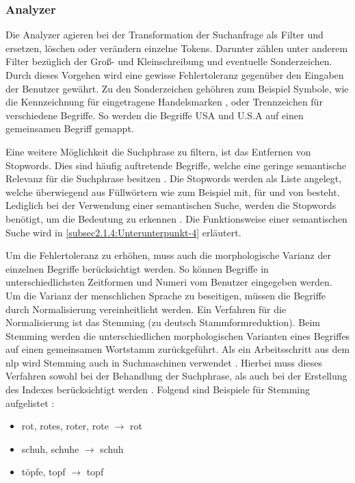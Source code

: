 \subsubsection{Analyzer}

Die Analyzer agieren bei der Transformation der Suchanfrage als Filter und ersetzen, löschen oder verändern einzelne Tokens. Darunter zählen unter anderem Filter bezüglich der Groß- und Kleinschreibung und eventuelle Sonderzeichen. Durch dieses Vorgehen wird eine gewisse Fehlertoleranz gegenüber den Eingaben der Benutzer gewährt. Zu den Sonderzeichen gehöhren zum Beispiel Symbole, wie die Kennzeichnung für eingetragene Handelsmarken \glqq \textregistered\grqq{}, oder Trennzeichen für verschiedene Begriffe. So werden die Begriffe \glqq USA\grqq{} und \glqq U.S.A\grqq{} auf einen gemeinsamen Begriff gemappt.

Eine weitere Möglichkeit die Suchphrase zu filtern, ist das Entfernen von Stopwords. Dies sind häufig auftretende Begriffe, welche eine geringe semantische Relevanz für die Suchphrase besitzen \cite{SebastianRuss.2017}. Die Stopwords werden als Liste angelegt, welche überwiegend aus Füllwörtern wie zum Beispiel \glqq mit\grqq{}, \glqq für\grqq{} und \glqq von\grqq{} besteht. Lediglich bei der Verwendung einer semantischen Suche, werden die Stopwords benötigt, um die Bedeutung zu erkennen \cite{SebastianRuss.2017}. Die Funktionsweise einer semantischen Suche wird in \autoref{subsec2.1.4:Unterunterpunkt-4} erläutert.

Um die Fehlertoleranz zu erhöhen, muss auch die morphologische Varianz der einzelnen Begriffe berücksichtigt werden. So können Begriffe in unterschiedlichsten Zeitformen und Numeri vom Benutzer eingegeben werden. Um die Varianz der menschlichen Sprache zu beseitigen, müssen die Begriffe durch Normalisierung vereinheitlicht werden. Ein Verfahren für die Normalisierung ist das \glqq Stemming\grqq{} (zu deutsch Stammformreduktion). Beim Stemming werden die unterschiedlichen morphologischen Varianten eines Begriffes auf einen gemeinsamen Wortstamm zurückgeführt. Als ein Arbeitsschritt aus dem \gls{nlp} wird Stemming auch in Suchmaschinen verwendet \cite{StefanLuber.2020}. Hierbei muss dieses Verfahren sowohl bei der Behandlung der Suchphrase, als auch bei der Erstellung des Indexes berücksichtigt werden \cite{SebastianRuss.2017}. Folgend sind Beispiele für Stemming aufgelistet \cite{SebastianRuss.2017}:

\begin{itemize}
    \item rot, rotes, roter, rote $\rightarrow$ rot
    \item schuh, schuhe $\rightarrow$ schuh
    \item töpfe, topf $\rightarrow$ topf
\end{itemize}

